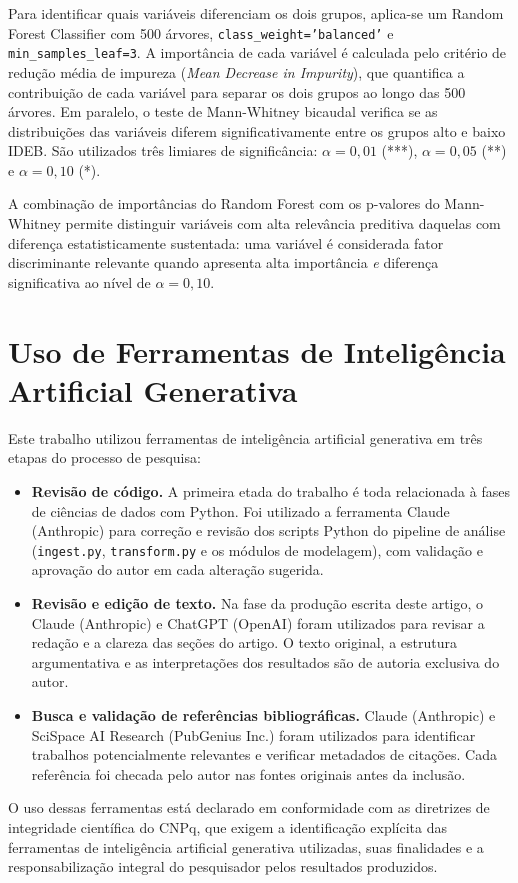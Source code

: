 Para identificar quais variáveis diferenciam os dois grupos, aplica-se um Random Forest Classifier \cite{breiman2001} com 500 árvores, \texttt{class\_weight='balanced'} e \texttt{min\_samples\_leaf=3}. A importância de cada variável é calculada pelo critério de redução média de impureza (\textit{Mean Decrease in Impurity}), que quantifica a contribuição de cada variável para separar os dois grupos ao longo das 500 árvores. Em paralelo, o teste de Mann-Whitney \cite{mannwhitney1947} bicaudal verifica se as distribuições das variáveis diferem significativamente entre os grupos alto e baixo IDEB. São utilizados três limiares de significância: $\alpha = 0{,}01$ (***), $\alpha = 0{,}05$ (**) e $\alpha = 0{,}10$ (*).

A combinação de importâncias do Random Forest com os p-valores do Mann-Whitney permite distinguir variáveis com alta relevância preditiva daquelas com diferença estatisticamente sustentada: uma variável é considerada fator discriminante relevante quando apresenta alta importância \textit{e} diferença significativa ao nível de $\alpha = 0{,}10$.

\section{Uso de Ferramentas de Inteligência Artificial Generativa}
\label{sec:uso_ia}

Este trabalho utilizou ferramentas de inteligência artificial generativa em três etapas do processo de pesquisa:

\begin{itemize}
    \item \textbf{Revisão de código.} A primeira etada do trabalho é toda relacionada à fases de ciências de dados com Python. Foi utilizado a ferramenta Claude (Anthropic) para correção e revisão dos scripts Python do pipeline de análise (\texttt{ingest.py}, \texttt{transform.py} e os módulos de modelagem), com validação e aprovação do autor em cada alteração sugerida.
    \item \textbf{Revisão e edição de texto.} Na fase da produção escrita deste artigo, o Claude (Anthropic) e ChatGPT (OpenAI) foram utilizados para revisar a redação e a clareza das seções do artigo. O texto original, a estrutura argumentativa e as interpretações dos resultados são de autoria exclusiva do autor.
    \item \textbf{Busca e validação de referências bibliográficas.} Claude (Anthropic) e SciSpace AI Research (PubGenius Inc.) foram utilizados para identificar trabalhos potencialmente relevantes e verificar metadados de citações. Cada referência foi checada pelo autor nas fontes originais antes da inclusão.
\end{itemize}

O uso dessas ferramentas está declarado em conformidade com as diretrizes de integridade científica do CNPq, que exigem a identificação explícita das ferramentas de inteligência artificial generativa utilizadas, suas finalidades e a responsabilização integral do pesquisador pelos resultados produzidos.
